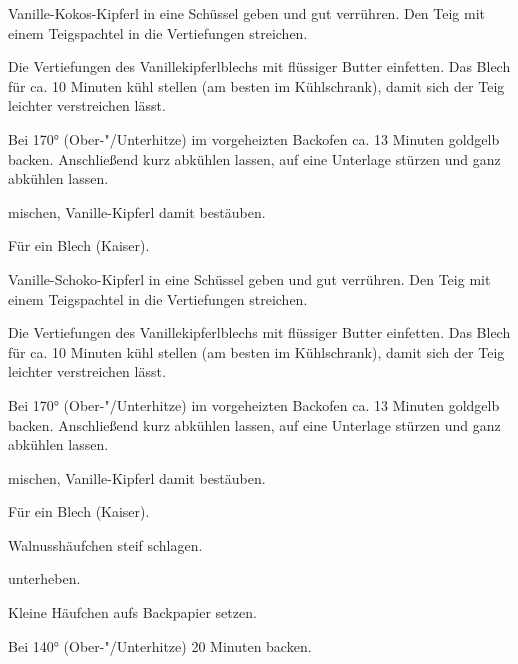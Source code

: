 \begin{recipe}{Vanille-Kokos-Kipferl}
  in eine Schüssel geben und gut verrühren. Den Teig mit einem
  Teigspachtel in die Vertiefungen streichen.

  Die Vertiefungen des Vanillekipferlblechs mit flüssiger Butter
  einfetten. Das Blech für ca. 10 Minuten kühl stellen (am besten im
  Kühlschrank), damit sich der Teig leichter verstreichen lässt.
  
  Bei 170° (Ober-"/Unterhitze) im vorgeheizten Backofen ca. 13 Minuten
  goldgelb backen. Anschließend kurz abkühlen lassen, auf eine Unterlage
  stürzen und ganz abkühlen lassen.
  
  mischen, Vanille-Kipferl damit bestäuben.

  Für ein Blech (Kaiser).
\end{recipe}



\begin{recipe}{Vanille-Schoko-Kipferl}
  in eine Schüssel geben und gut verrühren. Den Teig mit einem
  Teigspachtel in die Vertiefungen streichen.

  Die Vertiefungen des Vanillekipferlblechs mit flüssiger Butter
  einfetten. Das Blech für ca. 10 Minuten kühl stellen (am besten im
  Kühlschrank), damit sich der Teig leichter verstreichen lässt.
  
  Bei 170° (Ober-"/Unterhitze) im vorgeheizten Backofen ca. 13 Minuten
  goldgelb backen. Anschließend kurz abkühlen lassen, auf eine Unterlage
  stürzen und ganz abkühlen lassen.
  
  mischen, Vanille-Kipferl damit bestäuben.

  Für ein Blech (Kaiser).
\end{recipe}



\begin{recipe}{Walnusshäufchen}
  steif schlagen.

  unterheben.

  Kleine Häufchen aufs Backpapier setzen.

  Bei 140° (Ober-"/Unterhitze) 20 Minuten backen.
\end{recipe}



